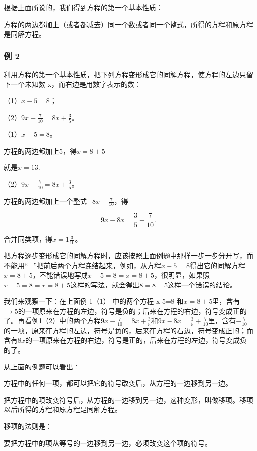 根据上面所说的，我们得到方程的第一个基本性质：

方程的两边都加上（或者都减去）同一个数或者同一个整式，所得的方程和原方程是同解方程。

\subsubsection{例 2}

利用方程的第一个基本性质，把下列方程变形成它的同解方程，使方程的左边只留下一个未知数
x，而右边是用数字表示的数：

（1）\(x - 5 = 8\)；

（2）\(9x - \frac{7}{10} = 8x + \frac{3}{5}\)。

 （1）\(x - 5 = 8\)。

方程的两边都加上5，得\(x = 8 + 5\)

就是\(x = 13.\)

（2）\(9x - \frac{7}{10} = 8x + \frac{3}{5}\)。

方程的两边都加上一个整式\(-8x + \frac{7}{10}\)，得

\[
9 x - 8 x = \frac{3}{5} + \frac{7}{10}.
\]

合并同类项，得\(x = 1 \frac{3}{10}\)。

把方程逐步变形成它的同解方程时，应该按照上面例题中那样一步一步分开写，而不能用``=''把前后两个方程连结起来，例如，从方程\(x - 5 = 8\)得出它的同解方程\(x = 8 + 5\)，不能错误地写成\(x - 5 = 8 = x = 8 + 5\)，很明显，如果照\(x - 5 = 8 = x = 8 + 5\)这样的写法，就会得出\(8 = 8 + 5\)这样一个错误的结论。

我们来观察一下：在上面例 1（1） 中的两个方程 x-5=8
和\(x=8+5\)里，含有\(\rightarrow5\)的一项原来在方程的左边，符号是负的；后来在方程的右边，符号变成正的了。再看例1（2）中的两个方程\(9x - \frac{7}{10} = 8x + \frac{3}{5}\)和\(9x - 8x = \frac{3}{5} + \frac{7}{10}\)里，含有\(-\frac{7}{10}\)的一项，原来在方程的左边，符号是负的，后来在方程的右边，符号变成正的；而含有\(8x\)的一项原来在方程的右边，符号是正的，后来在方程的左边，符号变成负的了。

从上面的例题可以看出：

方程中的任何一项，都可以把它的符号改变后，从方程的一边移到另一边。

把方程中的项改变符号后，从方程的一边移到另一边，这种变形，叫做移项。移项以后所得的方程和原方程是同解方程。

移项的法则是：

要把方程中的项从等号的一边移到另一边，必须改变这个项的符号。

